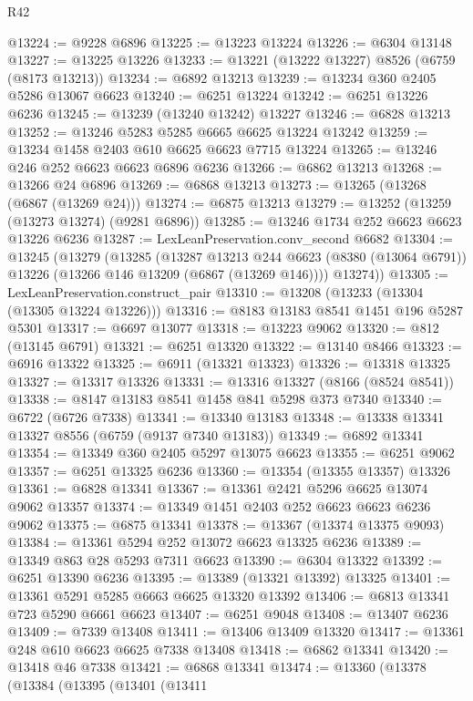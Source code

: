 \begin{lexlean}{R42}
\begin{coremodule}
{@13224 := @9228 @6896
@13225 := @13223 @13224
@13226 := @6304 @13148
@13227 := @13225 @13226
@13233 := @13221 (@13222 @13227) @8526 (@6759 (@8173 @13213))
@13234 := @6892 @13213
@13239 := @13234 @360 @2405 @5286 @13067 @6623
@13240 := @6251 @13224
@13242 := @6251 @13226 @6236
@13245 := @13239 (@13240 @13242) @13227
@13246 := @6828 @13213
@13252 := @13246 @5283 @5285 @6665 @6625 @13224 @13242
@13259 := @13234 @1458 @2403 @610 @6625 @6623 @7715 @13224
@13265 := @13246 @246 @252 @6623 @6623 @6896 @6236
@13266 := @6862 @13213
@13268 := @13266 @24 @6896
@13269 := @6868 @13213
@13273 := @13265 (@13268 (@6867 (@13269 @24)))
@13274 := @6875 @13213
@13279 := @13252 (@13259 (@13273 @13274) (@9281 @6896))
@13285 := @13246 @1734 @252 @6623 @6623 @13226 @6236
@13287 := LexLeanPreservation.conv_second @6682
@13304 := @13245
    (@13279
      (@13285
        (@13287
          @13213
          @244
          @6623
          (@8380 (@13064 @6791))
          @13226
          (@13266 @146 @13209 (@6867 (@13269 @146))))
        @13274))
@13305 := LexLeanPreservation.construct_pair
@13310 := @13208 (@13233 (@13304 (@13305 @13224 @13226)))
@13316 := @8183 @13183 @8541 @1451 @196 @5287 @5301
@13317 := @6697 @13077
@13318 := @13223 @9062
@13320 := @812 (@13145 @6791)
@13321 := @6251 @13320
@13322 := @13140 @8466
@13323 := @6916 @13322
@13325 := @6911 (@13321 @13323)
@13326 := @13318 @13325
@13327 := @13317 @13326
@13331 := @13316 @13327 (@8166 (@8524 @8541))
@13338 := @8147 @13183 @8541 @1458 @841 @5298 @373 @7340
@13340 := @6722 (@6726 @7338)
@13341 := @13340 @13183
@13348 := @13338 @13341 @13327 @8556 (@6759 (@9137 @7340 @13183))
@13349 := @6892 @13341
@13354 := @13349 @360 @2405 @5297 @13075 @6623
@13355 := @6251 @9062
@13357 := @6251 @13325 @6236
@13360 := @13354 (@13355 @13357) @13326
@13361 := @6828 @13341
@13367 := @13361 @2421 @5296 @6625 @13074 @9062 @13357
@13374 := @13349 @1451 @2403 @252 @6623 @6623 @6236 @9062
@13375 := @6875 @13341
@13378 := @13367 (@13374 @13375 @9093)
@13384 := @13361 @5294 @252 @13072 @6623 @13325 @6236
@13389 := @13349 @863 @28 @5293 @7311 @6623
@13390 := @6304 @13322
@13392 := @6251 @13390 @6236
@13395 := @13389 (@13321 @13392) @13325
@13401 := @13361 @5291 @5285 @6663 @6625 @13320 @13392
@13406 := @6813 @13341 @723 @5290 @6661 @6623
@13407 := @6251 @9048
@13408 := @13407 @6236
@13409 := @7339 @13408
@13411 := @13406 @13409 @13320
@13417 := @13361 @248 @610 @6623 @6625 @7338 @13408
@13418 := @6862 @13341
@13420 := @13418 @46 @7338
@13421 := @6868 @13341
@13474 := @13360
    (@13378
      (@13384
        (@13395
          (@13401
            (@13411
}
\end{coremodule}
\end{lexlean}
